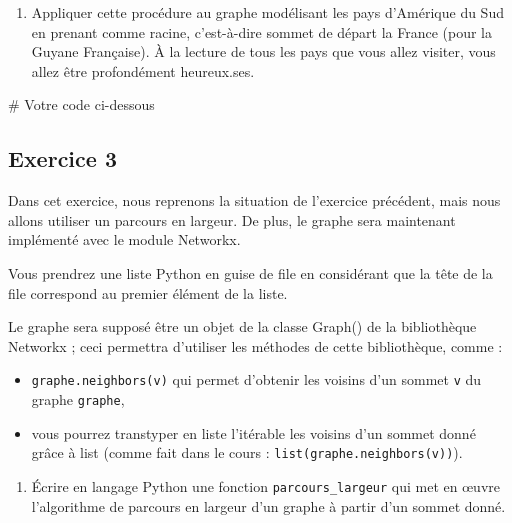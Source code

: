 \documentclass[
  a4paper,
  DIV=11,
  numbers=noendperiod]{scrartcl}
\newenvironment{Shaded}{\begin{snugshade}}{\end{snugshade}}
\newcommand{\CommentTok}[1]{\textcolor[rgb]{0.37,0.37,0.37}{#1}}
\providecommand{\tightlist}{%
  \setlength{\itemsep}{0pt}\setlength{\parskip}{0pt}}\usepackage{longtable,booktabs,array}
\begin{document}
\begin{enumerate}
\def\labelenumi{\arabic{enumi}.}
\setcounter{enumi}{3}
\tightlist
\item
  Appliquer cette procédure au graphe modélisant les pays d'Amérique du
  Sud en prenant comme racine, c'est-à-dire sommet de départ la France
  (pour la Guyane Française). À la lecture de tous les pays que vous
  allez visiter, vous allez être profondément heureux.ses.
\end{enumerate}

\begin{Shaded}
\begin{Highlighting}[]
\CommentTok{\# Votre code ci{-}dessous}
\end{Highlighting}
\end{Shaded}

\hypertarget{exercice-3}{%
\subsection{Exercice 3}\label{exercice-3}}

Dans cet exercice, nous reprenons la situation de l'exercice précédent,
mais nous allons utiliser un parcours en largeur. De plus, le graphe
sera maintenant implémenté avec le module Networkx.

Vous prendrez une liste Python en guise de file en considérant que la
tête de la file correspond au premier élément de la liste.

Le graphe sera supposé être un objet de la classe Graph() de la
bibliothèque Networkx ; ceci permettra d'utiliser les méthodes de cette
bibliothèque, comme :

\begin{itemize}
\item
  \texttt{graphe.neighbors(v)} qui permet d'obtenir les voisins d'un
  sommet \texttt{v} du graphe \texttt{graphe},
\item
  vous pourrez transtyper en liste l'itérable les voisins d'un sommet
  donné grâce à list (comme fait dans le cours :
  \texttt{list(graphe.neighbors(v))}).
\end{itemize}

\begin{enumerate}
\def\labelenumi{\arabic{enumi}.}
\tightlist
\item
  Écrire en langage Python une fonction \texttt{parcours\_largeur} qui
  met en œuvre l'algorithme de parcours en largeur d'un graphe à partir
  d'un sommet donné.
\end{enumerate}
\end{document}
